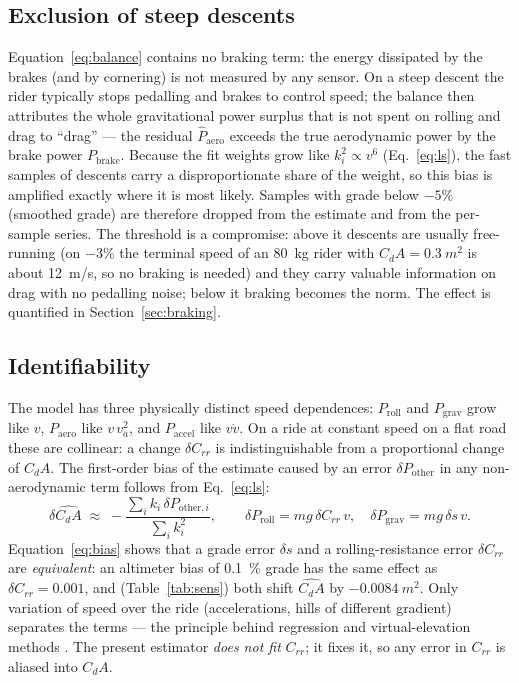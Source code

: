 \documentclass[11pt,a4paper]{article}
\newcommand{\CdA}{C_{\!d}A}
\begin{document}
\subsection{Exclusion of steep descents}
\label{sec:descents}
Equation~\eqref{eq:balance} contains no braking term: the energy dissipated by the brakes (and by cornering) is not measured by any sensor. On a steep descent the rider typically stops pedalling and brakes to control speed; the balance then attributes the whole gravitational power surplus that is not spent on rolling and drag to ``drag'' --- the residual \(\hat P_{\mathrm{aero}}\) exceeds the true aerodynamic power by the brake power \(P_{\mathrm{brake}}\). Because the fit weights grow like \(k_i^2\propto v^6\) (Eq.~\eqref{eq:ls}), the fast samples of descents carry a disproportionate share of the weight, so this bias is amplified exactly where it is most likely. Samples with grade below \(-5\%\) (smoothed grade) are therefore dropped from the estimate and from the per-sample series. The threshold is a compromise: above it descents are usually free-running (on \(-3\%\) the terminal speed of an \SI{80}{kg} rider with \(\CdA=\SI{0.3}{m^2}\) is about \SI{12}{m/s}, so no braking is needed) and they carry valuable information on drag with no pedalling noise; below it braking becomes the norm. The effect is quantified in Section~\ref{sec:braking}.

\subsection{Identifiability}
The model has three physically distinct speed dependences: \(P_{\mathrm{roll}}\) and \(P_{\mathrm{grav}}\) grow like \(v\), \(P_{\mathrm{aero}}\) like \(v\,v_a^2\), and \(P_{\mathrm{accel}}\) like \(v\dot v\). On a ride at constant speed on a flat road these are collinear: a change \(\delta C_{rr}\) is indistinguishable from a proportional change of \(\CdA\). The first-order bias of the estimate caused by an error \(\delta P_{\mathrm{other}}\) in any non-aerodynamic term follows from Eq.~\eqref{eq:ls}:
\begin{equation}
 \delta\widehat{\CdA}\;\approx\;-\frac{\sum_i k_i\,\delta P_{\mathrm{other},i}}{\sum_i k_i^2},
 \qquad
 \delta P_{\mathrm{roll}}=m g\,\delta C_{rr}\,v,\quad
 \delta P_{\mathrm{grav}}=m g\,\delta s\,v.
 \label{eq:bias}
\end{equation}
Equation~\eqref{eq:bias} shows that a grade error \(\delta s\) and a rolling-resistance error \(\delta C_{rr}\) are \emph{equivalent}: an altimeter bias of \SI{0.1}{\percent} grade has the same effect as \(\delta C_{rr}=0.001\), and (Table~\ref{tab:sens}) both shift \(\widehat{\CdA}\) by \(-0.0084\ \si{m^2}\). Only variation of speed over the ride (accelerations, hills of different gradient) separates the terms --- the principle behind regression and virtual-elevation methods \citep{martin1998,chung,debraux2011}. The present estimator \emph{does not fit} \(C_{rr}\); it fixes it, so any error in \(C_{rr}\) is aliased into \(\CdA\).
\end{document}
